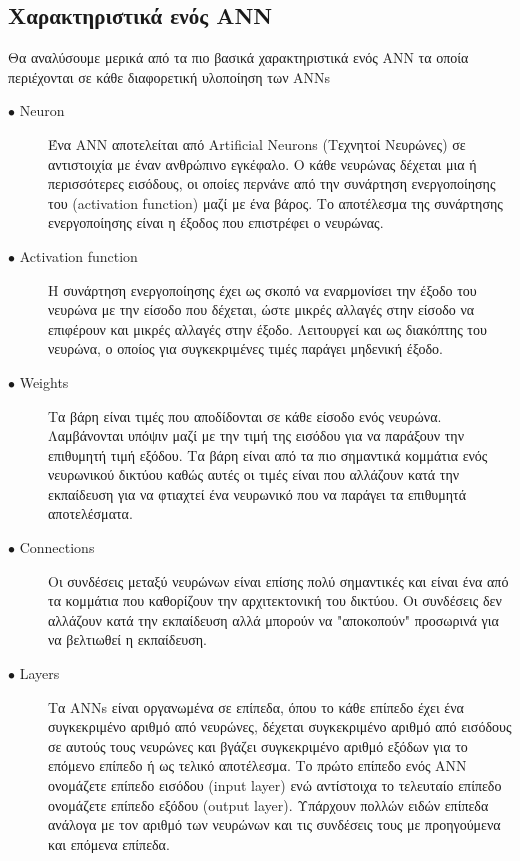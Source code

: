 \subsection{Χαρακτηριστικά ενός ANN}
Θα αναλύσουμε μερικά από τα πιο βασικά χαρακτηριστικά ενός ANN τα οποία περιέχονται σε κάθε διαφορετική υλοποίηση των ANNs

\begin{description}

\item[$\bullet$ Neuron] Ένα ANN αποτελείται από Artificial Neurons (Τεχνητοί Νευρώνες) σε αντιστοιχία με έναν ανθρώπινο εγκέφαλο. Ο κάθε νευρώνας δέχεται μια ή περισσότερες εισόδους, οι οποίες περνάνε από την συνάρτηση ενεργοποίησης του (activation function) μαζί με ένα βάρος. Το αποτέλεσμα της συνάρτησης ενεργοποίησης είναι η έξοδος που επιστρέφει ο νευρώνας.

\item[$\bullet$ Activation function] Η συνάρτηση ενεργοποίησης έχει ως σκοπό να εναρμονίσει την έξοδο του νευρώνα με την είσοδο που δέχεται, ώστε μικρές αλλαγές στην είσοδο να επιφέρουν και μικρές αλλαγές στην έξοδο. Λειτουργεί και ως διακόπτης του νευρώνα, ο οποίος για συγκεκριμένες τιμές παράγει μηδενική έξοδο.

\item[$\bullet$ Weights] Τα βάρη είναι τιμές που αποδίδονται σε κάθε είσοδο ενός νευρώνα. Λαμβάνονται υπόψιν μαζί με την τιμή της εισόδου για να παράξουν την επιθυμητή τιμή εξόδου. Τα βάρη είναι από τα πιο σημαντικά κομμάτια ενός νευρωνικού δικτύου καθώς αυτές οι τιμές είναι που αλλάζουν κατά την εκπαίδευση για να φτιαχτεί ένα νευρωνικό που να παράγει τα επιθυμητά αποτελέσματα.

\item[$\bullet$ Connections] Οι συνδέσεις μεταξύ νευρώνων είναι επίσης πολύ σημαντικές και είναι ένα από τα κομμάτια που καθορίζουν την αρχιτεκτονική του δικτύου. Οι συνδέσεις δεν αλλάζουν κατά την εκπαίδευση αλλά μπορούν να "αποκοπούν" προσωρινά για να βελτιωθεί η εκπαίδευση.

\item[$\bullet$ Layers] Τα ANNs είναι οργανωμένα σε επίπεδα, όπου το κάθε επίπεδο έχει ένα συγκεκριμένο αριθμό από νευρώνες, δέχεται συγκεκριμένο αριθμό από εισόδους σε αυτούς τους νευρώνες και βγάζει συγκεκριμένο αριθμό εξόδων για το επόμενο επίπεδο ή ως τελικό αποτέλεσμα. Το πρώτο επίπεδο ενός ANN ονομάζετε επίπεδο εισόδου (input layer) ενώ αντίστοιχα το τελευταίο επίπεδο ονομάζετε επίπεδο εξόδου (output layer). Υπάρχουν πολλών ειδών επίπεδα ανάλογα με τον αριθμό των νευρώνων και τις συνδέσεις τους με προηγούμενα και επόμενα επίπεδα. 

\end{description}


